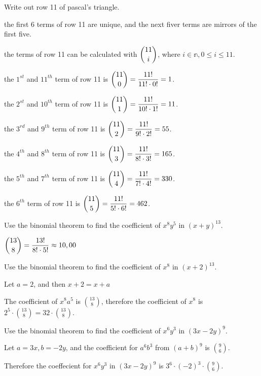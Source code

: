 \documentclass[openany, 12pt]{book}
\begin{document}
\begin{exercise}{}{}
	Write out row 11 of pascal's triangle.
	\begin{alist}
		\item the first 6 terms of row 11 are unique, and the next fiver terms
		are mirrors of the first five.
		\item the terms of row 11 can be calculated with $\dbinom{11}{i}$, where
		$i \in \mathbb{n}, 0 \leq i \leq 11$.
		\item the $1^{st}$ and $11^{th}$ term of row 11 is
		$\dbinom{11}{0}=\dfrac{11!}{11!\cdot0!}=1$.
		\item the $2^{st}$ and $10^{th}$ term of row 11 is
		$\dbinom{11}{1}=\dfrac{11!}{10!\cdot1!}=11$.
		\item the $3^{rd}$ and $9^{th}$ term of row 11 is
		$\dbinom{11}{2}=\dfrac{11!}{9!\cdot2!}=55$.
		\item the $4^{th}$ and $8^{th}$ term of row 11 is
		$\dbinom{11}{3}=\dfrac{11!}{8!\cdot3!}=165$.
		\item the $5^{th}$ and $7^{th}$ term of row 11 is
		$\dbinom{11}{4}=\dfrac{11!}{7!\cdot4!}=330$.
		\item the $6^{th}$ term of row 11 is
		$\dbinom{11}{5}=\dfrac{11!}{5!\cdot6!}=462$.
	\end{alist}
\end{exercise}

\begin{exercise}{}{}
	Use the binomial theorem to find the coefficient of $x^8 y^5$
	in $(x+ y)^{13}$.
	\begin{alist}
		\item $\dbinom{13}{8}=\dfrac{13!}{8!\cdot5!}\approx 10,00$
	\end{alist}
\end{exercise}

\begin{exercise}{}{}
	Use the binomial theorem to find the coefficient of $x^8$
	in $(x+2)^{13}$.
	\begin{alist}
		\item Let $a=2$, and then $x+2=x+a$
		\item The coefficient of $x^8a^5$ is $\binom{13}{8}$, therefore the coefficient
		of $x^8$ is $2^5\cdot\binom{13}{8}=32\cdot\binom{13}{8}$.
	\end{alist}
\end{exercise}

\begin{exercise}{}{}
	Use the binomial theorem to find the coefficient of $x^6y^3$
	in $(3x-2y)^9$.
	\begin{alist}
		\item Let $a=3x, b=-2y$, and the coefficient for $a^6b^3$ from $(a+b)^9$
		is $\binom{9}{6}$.
		\item Therefore the coeffecient for $x^6y^3$ in $(3x-2y)^9$ is
		$3^6\cdot(-2)^3\cdot\binom{9}{6}$.
	\end{alist}
\end{exercise}
\end{document}
